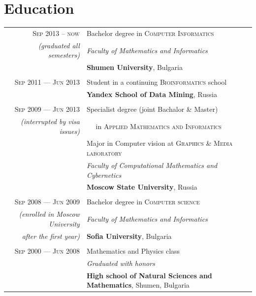 \documentclass[a4paper,10pt]{article}
\def\myline{\color{linegray}\vline}
\begin{document}
\section{Education}
\hspace{0mm}\begin{tabular}{r!{\myline}p{14cm}}
  \textsc{Sep 2013 -- now}     &  Bachelor degree in \textsc{Computer Informatics}\\
        \small\textit{(graduated all semesters)}  &  \textit{Faculty of Mathematics and Informatics}\\
                                  &  \textbf{Shumen University}, Bulgaria\\

        \\
        \textsc{Sep 2011 --- Jun 2013}     &  Student in a continuing \textsc{Bioinformatics} school\\
	                          &  \textbf{Yandex School of Data Mining}, Russia\\
	
        \\
  \textsc{Sep 2009 --- Jun 2013}     &  Specialist degree {\small(joint Bachalor \& Master)}\\
        \small\textit{(interrupted by visa issues)} &  $\quad$ in \textsc{Applied Mathematics and Informatics}\\
                                  &  Major in Computer vision at \textsc{Graphics \& Media laboratory}\\
                                  &  \textit{Faculty of Computational Mathematics and Cybernetics}\\
                                  &  \textbf{Moscow State University}, Russia\\

	\\
	\textsc{Sep 2008 --- Jun 2009}     &  Bachelor degree in \textsc{Computer science}\\
        {\small\textit{(enrolled in Moscow University}} &  \textit{Faculty of Mathematics and Informatics}\\
        {\small\textit{after the first year)}} &  \textbf{Sofia University}, Bulgaria\\
	
	\\
	\textsc{Sep 2000 --- Jun 2008}     &  Mathematics and Physics class\\
                                  &  \textit{Graduated with honors}\\
                                  &  \textbf{High school of Natural Sciences and Mathematics}, Shumen, Bulgaria\\
\end{tabular}
\par\smallskip
\end{document}
